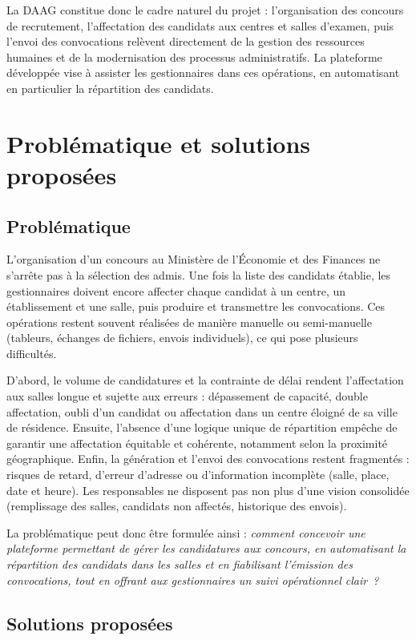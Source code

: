 \begin{onehalfspace}
La DAAG constitue donc le cadre naturel du projet : l'organisation des concours de recrutement, l'affectation des candidats aux centres et salles d'examen, puis l'envoi des convocations relèvent directement de la gestion des ressources humaines et de la modernisation des processus administratifs. La plateforme développée vise à assister les gestionnaires dans ces opérations, en automatisant en particulier la répartition des candidats.

\section{Problématique et solutions proposées}

\subsection{Problématique}

L'organisation d'un concours au Ministère de l'Économie et des Finances ne s'arrête pas à la sélection des admis. Une fois la liste des candidats établie, les gestionnaires doivent encore affecter chaque candidat à un centre, un établissement et une salle, puis produire et transmettre les convocations. Ces opérations restent souvent réalisées de manière manuelle ou semi-manuelle (tableurs, échanges de fichiers, envois individuels), ce qui pose plusieurs difficultés.

D'abord, le volume de candidatures et la contrainte de délai rendent l'affectation aux salles longue et sujette aux erreurs : dépassement de capacité, double affectation, oubli d'un candidat ou affectation dans un centre éloigné de sa ville de résidence. Ensuite, l'absence d'une logique unique de répartition empêche de garantir une affectation équitable et cohérente, notamment selon la proximité géographique. Enfin, la génération et l'envoi des convocations restent fragmentés : risques de retard, d'erreur d'adresse ou d'information incomplète (salle, place, date et heure). Les responsables ne disposent pas non plus d'une vision consolidée (remplissage des salles, candidats non affectés, historique des envois).

La problématique peut donc être formulée ainsi : \textit{comment concevoir une plateforme permettant de gérer les candidatures aux concours, en automatisant la répartition des candidats dans les salles et en fiabilisant l'émission des convocations, tout en offrant aux gestionnaires un suivi opérationnel clair~?}

\subsection{Solutions proposées}


\end{onehalfspace}
